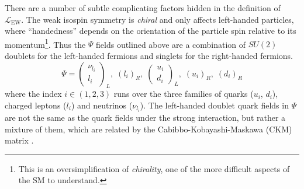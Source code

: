 There are a number of subtle complicating factors hidden in the definition of $\mathcal{L}_{\mathrm{EW}}$.
The weak isospin symmetry is \textit{chiral} and only affects left-handed particles, where ``handedness'' depends on the orientation of the particle spin relative to its momentum\footnote{This is an oversimplification of \textit{chirality}, one of the more difficult aspects of the SM to understand.}.
Thus the $\Psi$ fields outlined above are a combination of $SU(2)$ doublets for the left-handed fermions and singlets for the right-handed fermions.
\begin{equation}
    \Psi = \begin{pmatrix}
           \nu_{l_i} \\
           l_i
         \end{pmatrix}_L,\;
         (l_i)_R,\;
    \begin{pmatrix}
           u_i \\
           d_i
        \end{pmatrix}_L,\;
        (u_i)_R,\; (d_i)_R
\end{equation}
where the index $i \in (1,2,3)$ runs over the three families of quarks ($u_i$, $d_i$), charged leptons ($l_i$) and neutrinos ($\nu_{l_i}$).
The left-handed doublet quark fields in $\Psi$ are not the same as the quark fields under the strong interaction, but rather a mixture of them, which are related by the Cabibbo-Kobayashi-Maskawa (CKM) matrix \cite{Kobayashi:1973fv, Cabibbo:1963yz}.

